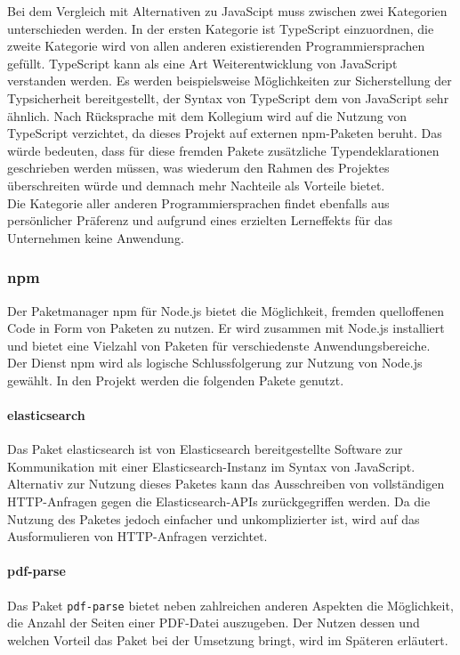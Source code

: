 \documentclass[a4paper]{scrartcl}
\begin{document}
Bei dem Vergleich mit Alternativen zu JavaScipt muss zwischen zwei Kategorien unterschieden werden. In der ersten Kategorie ist TypeScript einzuordnen, die zweite Kategorie wird von allen anderen existierenden Programmiersprachen gefüllt. TypeScript kann als eine Art Weiterentwicklung von JavaScript verstanden werden. Es werden beispielsweise Möglichkeiten zur Sicherstellung der Typsicherheit bereitgestellt, der Syntax von TypeScript dem von JavaScript sehr ähnlich. Nach Rücksprache mit dem Kollegium wird auf die Nutzung von TypeScript verzichtet, da dieses Projekt auf externen npm-Paketen beruht. Das würde bedeuten, dass für diese fremden Pakete zusätzliche Typendeklarationen geschrieben werden müssen, was wiederum den Rahmen des Projektes überschreiten würde und demnach mehr Nachteile als Vorteile bietet. \\
Die Kategorie aller anderen Programmiersprachen findet ebenfalls aus persönlicher Präferenz und aufgrund eines erzielten Lerneffekts für das Unternehmen keine Anwendung.

\subsubsection{npm}
Der Paketmanager npm für Node.js bietet die Möglichkeit, fremden quelloffenen Code in Form von Paketen zu nutzen. Er wird zusammen mit Node.js installiert und bietet eine Vielzahl von Paketen für verschiedenste Anwendungsbereiche.\\
Der Dienst npm wird als logische Schlussfolgerung zur Nutzung von Node.js gewählt. In den Projekt werden die folgenden Pakete genutzt.

\paragraph{elasticsearch}
Das Paket elasticsearch ist von Elasticsearch bereitgestellte Software zur Kommunikation mit einer Elasticsearch-Instanz im Syntax von JavaScript. \\
Alternativ zur Nutzung dieses Paketes kann das Ausschreiben von vollständigen HTTP-Anfragen gegen die Elasticsearch-APIs zurückgegriffen werden. Da die Nutzung des Paketes jedoch einfacher und unkomplizierter ist, wird auf das Ausformulieren von HTTP-Anfragen verzichtet.

\paragraph{pdf-parse}
Das Paket \texttt{pdf-parse} bietet neben zahlreichen anderen Aspekten die Möglichkeit, die Anzahl der Seiten einer PDF-Datei auszugeben. Der Nutzen dessen und welchen Vorteil das Paket bei der Umsetzung bringt, wird im Späteren erläutert.
\end{document}
